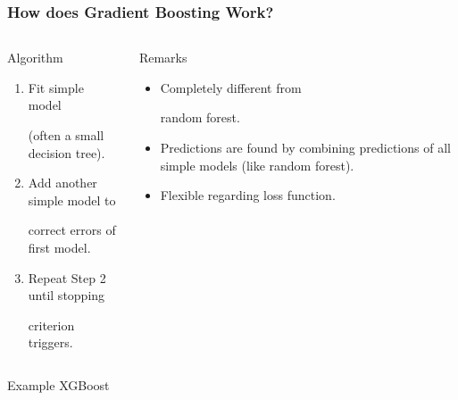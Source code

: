 \documentclass[
    utf8,
    aspectratio=169
]{beamer}  %
\begin{document}
\begin{frame}
	\frametitle{How does Gradient Boosting Work?}
	\begin{columns}[onlytextwidth]
		\begin{block}{Algorithm}
			\begin{enumerate}
				\item Fit simple model 
				
				(often a small decision tree).
				\item Add another simple model to 
				
				correct errors of first model.
				\item Repeat Step 2 until stopping
				
				criterion triggers.
			\end{enumerate}
		\end{block}
		\begin{alertblock}{Remarks}
			\begin{itemize}
				\item Completely different from 
				
				random forest.
				\item Predictions are found by combining predictions of all simple models (like random forest).
				\item Flexible regarding loss function.
			\end{itemize}
		\end{alertblock}
	\end{columns}

	\vfill

	\begin{exampleblock}{\centering Example XGBoost}
	\end{exampleblock}
\end{frame}
\end{document}
